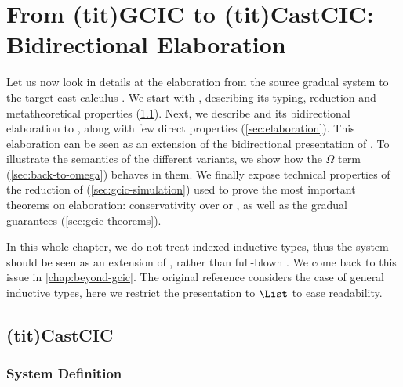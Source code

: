 \chapter{From \kl(tit){GCIC} to \kl(tit){CastCIC}: Bidirectional Elaboration}
\label{chap:bidir-gradual-elab}

\margintoc

Let us now look in details at the elaboration from the source gradual
system  to the target
cast calculus . We start with , describing its typing, reduction
and metatheoretical properties (\cref{sec:cast-calculus}).
%
Next, we describe  and its bidirectional elaboration to
, along with few direct properties (\cref{sec:elaboration}).
This elaboration can be seen as an extension of the bidirectional presentation of
.
%
To illustrate the semantics of the different  variants, we show how
the $\Omega$ term (\cref{sec:back-to-omega}) behaves in them.
We finally expose technical properties
of the reduction of  (\cref{sec:gcic-simulation}) used to prove the most
important theorems on elaboration: conservativity over  or , as well as
the gradual guarantees (\cref{sec:gcic-theorems}).

In this whole chapter, we do not treat indexed inductive types, thus the system should be
seen as an extension of , rather than full-blown . We come back to this
issue in \cref{chap:beyond-gcic}. The original reference 
considers the case of general inductive types, here we restrict the presentation to
$\List$ to ease readability.

\section{\kl(tit){CastCIC}}
\label{sec:cast-calculus}

\subsection{System Definition}

